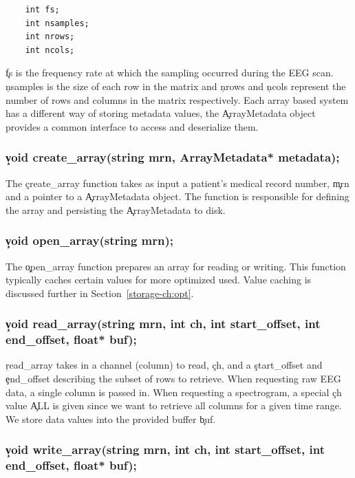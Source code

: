 \begin{lstlisting}
    int fs;
    int nsamples;
    int nrows;
    int ncols;
\end{lstlisting}

\c{fs} is the frequency rate at which the sampling occurred during the EEG
scan. \c{nsamples} is the size of each row in the matrix and \c{nrows} and
\c{ncols} represent the number of rows and columns in the matrix respectively.
Each array based system has a different way of storing metadata values, the
\c{ArrayMetadata} object provides a common interface to access and deserialize them.

\subsubsection{\c{void create\_array(string mrn, ArrayMetadata* metadata);}}

The \c{create\_array} function takes as input a patient's medical record
number, \c{mrn} and a pointer to a \c{ArrayMetadata} object. The function is
responsible for defining the array and persisting the \c{ArrayMetadata} to
disk.

\subsubsection{\c{void open\_array(string mrn);}}

The \c{open\_array} function prepares an array for reading or writing. This
function typically caches certain values for more optimized used. Value caching is
discussed further in Section~\ref{storage-ch:opt}.

\subsubsection{\c{void read\_array(string mrn, int ch, int start\_offset, int end\_offset, float* buf);}}

\c{read\_array} takes in a channel (column) to read, \c{ch}, and a
\c{start\_offset} and \c{end\_offset} describing the subset of rows to
retrieve. When requesting raw EEG data, a single column is passed in. When
requesting a spectrogram, a special \c{ch} value \c{ALL} is given since we want
to retrieve all columns for a given time range. We store data values into
the provided buffer \c{buf}.

\subsubsection{\c{void write\_array(string mrn, int ch, int start\_offset, int end\_offset, float* buf);}}

